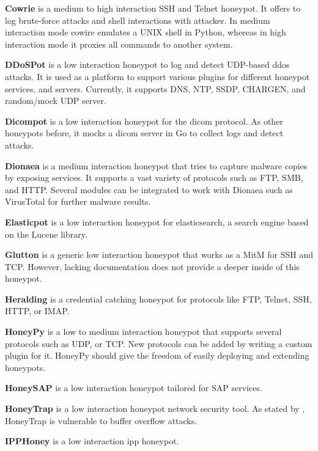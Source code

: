 \textbf{Cowrie} \cite{cowire2021} is a medium to high interaction SSH and Telnet honeypot.
It offers to log brute-force attacks and shell interactions with attacker.
In medium interaction mode cowire emulates a UNIX shell in Python, whereas in high interaction mode it proxies all commands to another system.

\textbf{DDoSPot} \cite{ddosspot2021} is a low interaction honeypot to log and detect UDP-based \ac{ddos} attacks.
It is used as a platform to support various plugins for different honeypot services, and servers.
Currently, it supports DNS, NTP, SSDP, CHARGEN, and random/mock UDP server.

\textbf{Dicompot} \cite{dicompot2021} is a low interaction honeypot for the \ac{dicom} protocol.
As other honeypots before, it mocks a \ac{dicom} server in Go to collect logs and detect attacks.

\textbf{Dionaea} \cite{dionaea2021} is a medium interaction honeypot that tries to capture malware copies by exposing services.
It supports a vast variety of protocols such as FTP, SMB, and HTTP.
Several modules can be integrated to work with Dionaea such as VirusTotal for further malware results.

\textbf{Elasticpot} \cite{elasticpot2021} is a low interaction honeypot for elasticsearch, a search engine based on the Lucene library.

\textbf{Glutton} \cite{glutton2021} is a generic low interaction honeypot that works as a MitM for SSH and TCP.
However, lacking documentation does not provide a deeper inside of this honeypot.

\textbf{Heralding} \cite{heralding2021} is a credential catching honeypot for protocols like FTP, Telnet, SSH, HTTP, or IMAP.

\textbf{HoneyPy} \cite{honeysap2021} is a low to medium interaction honeypot that supports several protocols such as UDP, or TCP.
New protocols can be added by writing a custom plugin for it.
HoneyPy should give the freedom of easily deploying and extending honeypots.

\textbf{HoneySAP} \cite{honeysap2021} is a low interaction honeypot tailored for SAP services.

\textbf{HoneyTrap} \cite{honeytrap2021} is a low interaction honeypot network security tool.
As stated by \citet*{honeytrap2021}, HoneyTrap is vulnerable to buffer overflow attacks.

\textbf{IPPHoney} \cite{ipphoney2021} is a low interaction \ac{ipp} honeypot.

